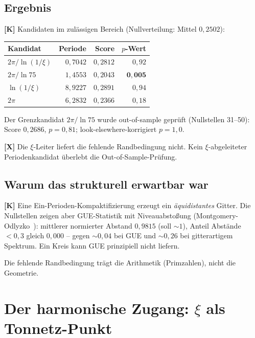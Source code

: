 \subsection{Ergebnis}

\textbf{[K]} Kandidaten im zul\"assigen Bereich (Nullverteilung: Mittel
$0{,}2502$):

\begin{center}
\begin{tabular}{lrrr}
\toprule
Kandidat & Periode & Score & $p$-Wert \\
\midrule
$2\pi/\ln(1/\xi)$ & $0{,}7042$ & $0{,}2812$ & $0{,}92$ \\
$2\pi/\ln 75$ & $1{,}4553$ & $0{,}2043$ & $\mathbf{0{,}005}$ \\
$\ln(1/\xi)$ & $8{,}9227$ & $0{,}2891$ & $0{,}94$ \\
$2\pi$ & $6{,}2832$ & $0{,}2366$ & $0{,}18$ \\
\bottomrule
\end{tabular}
\end{center}

Der Grenzkandidat $2\pi/\ln 75$ wurde out-of-sample gepr\"uft
(Nullstellen 31--50): Score $0{,}2686$, $p = 0{,}81$;
look-elsewhere-korrigiert $p = 1{,}0$.

\begin{keyresult}[Randbedingung]
\textbf{[X]} Die $\xi$-Leiter liefert die fehlende Randbedingung nicht.
Kein $\xi$-abgeleiteter Periodenkandidat \"uberlebt die
Out-of-Sample-Pr\"ufung.
\end{keyresult}

\subsection{Warum das strukturell erwartbar war}

\textbf{[K]} Eine Ein-Perioden-Kompaktifizierung erzeugt ein
\emph{\"aquidistantes} Gitter. Die Nullstellen zeigen aber
GUE-Statistik mit Niveauabsto\ss ung (Montgomery-Odlyzko~\cite{montgomery1973,odlyzko1987}): mittlerer
normierter Abstand $0{,}9815$ (soll ${\sim}1$), Anteil Abst\"ande
$< 0{,}3$ gleich \textbf{$0{,}000$} -- gegen ${\sim}0{,}04$ bei GUE und
${\sim}0{,}26$ bei gitterartigem Spektrum. Ein Kreis kann GUE
prinzipiell nicht liefern.

Die fehlende Randbedingung tr\"agt die Arithmetik (Primzahlen), nicht
die Geometrie.

\section{Der harmonische Zugang: $\xi$ als Tonnetz-Punkt}
\label{sec:tonnetz}

